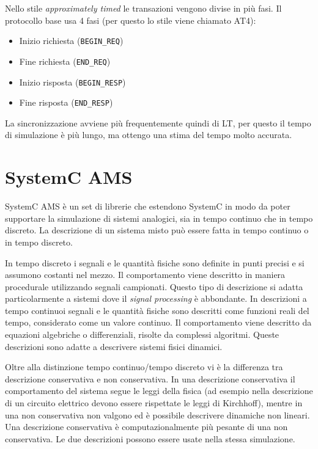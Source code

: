 \documentclass[10pt,a4paper,oneside]{scrbook}
\begin{document}
Nello stile \textit{approximately timed} le transazioni vengono divise in più fasi. Il protocollo base usa 4 fasi (per questo lo stile viene chiamato AT4):
\begin{itemize}
    \item Inizio richiesta (\texttt{BEGIN\_REQ})
    \item Fine richiesta (\texttt{END\_REQ})
    \item Inizio risposta (\texttt{BEGIN\_RESP})
    \item Fine risposta (\texttt{END\_RESP})
\end{itemize}
La sincronizzazione avviene più frequentemente quindi di LT, per questo il tempo di simulazione è più lungo, ma ottengo una stima del tempo molto accurata.


\section{SystemC AMS}
SystemC AMS è un set di librerie che estendono SystemC in modo da poter supportare la simulazione di sistemi analogici, sia in tempo continuo che in tempo discreto.
La descrizione di un sistema misto può essere fatta in tempo continuo o in tempo discreto.

In tempo discreto i segnali e le quantità fisiche sono definite in punti precisi e si assumono costanti nel mezzo.
Il comportamento viene descritto in maniera procedurale utilizzando segnali campionati.
Questo tipo di descrizione si adatta particolarmente a sistemi dove il \textit{signal processing} è abbondante.
In descrizioni a tempo continuoi segnali e le quantità fisiche sono descritti come funzioni reali del tempo,
considerato come un valore continuo.
Il comportamento viene descritto da equazioni algebriche o differenziali, risolte da complessi algoritmi.
Queste descrizioni sono adatte a descrivere sistemi fisici dinamici.

Oltre alla distinzione tempo continuo/tempo discreto vi è la differenza tra descrizione conservativa e non conservativa.
In una descrizione conservativa il comportamento del sistema segue le leggi della fisica (ad esempio nella descrizione
di un circuito elettrico devono essere rispettate le leggi di Kirchhoff), mentre in una non conservativa
non valgono ed è possibile descrivere dinamiche non lineari.
Una descrizione conservativa è computazionalmente più pesante di una non conservativa.
Le due descrizioni possono essere usate nella stessa simulazione.
\end{document}
